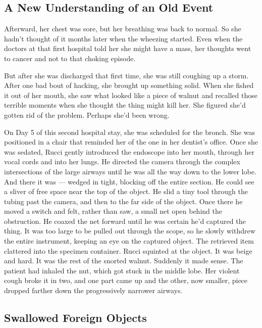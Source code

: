 \hypertarget{a-new-understanding-of-an-old-event}{%
\subsection{\texorpdfstring{\textbf{A New Understanding of an Old
Event}}{A New Understanding of an Old Event}}\label{a-new-understanding-of-an-old-event}}

Afterward, her chest was sore, but her breathing was back to normal. So
she hadn't thought of it months later when the wheezing started. Even
when the doctors at that first hospital told her she might have a mass,
her thoughts went to cancer and not to that choking episode.

But after she was discharged that first time, she was still coughing up
a storm. After one bad bout of hacking, she brought up something solid.
When she fished it out of her mouth, she saw what looked like a piece of
walnut and recalled those terrible moments when she thought the thing
might kill her. She figured she'd gotten rid of the problem. Perhaps
she'd been wrong.

On Day 5 of this second hospital stay, she was scheduled for the bronch.
She was positioned in a chair that reminded her of the one in her
dentist's office. Once she was sedated, Rucci gently introduced the
endoscope into her mouth, through her vocal cords and into her lungs. He
directed the camera through the complex intersections of the large
airways until he was all the way down to the lower lobe. And there it
was --- wedged in tight, blocking off the entire section. He could see a
sliver of free space near the top of the object. He slid a tiny tool
through the tubing past the camera, and then to the far side of the
object. Once there he moved a switch and felt, rather than saw, a small
net open behind the obstruction. He coaxed the net forward until he was
certain he'd captured the thing. It was too large to be pulled out
through the scope, so he slowly withdrew the entire instrument, keeping
an eye on the captured object. The retrieved item clattered into the
specimen container. Rucci squinted at the object. It was beige and hard.
It was the rest of the snorted walnut. Suddenly it made sense. The
patient had inhaled the nut, which got stuck in the middle lobe. Her
violent cough broke it in two, and one part came up and the other, now
smaller, piece dropped farther down the progressively narrower airways.

\hypertarget{swallowed-foreign-objects}{%
\subsection{\texorpdfstring{\textbf{Swallowed Foreign
Objects}}{Swallowed Foreign Objects}}\label{swallowed-foreign-objects}}

